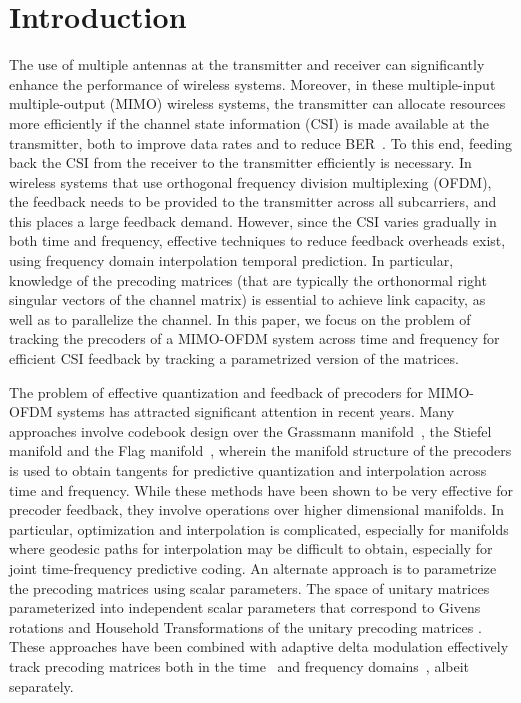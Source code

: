 \documentclass[journal,10pt,twocolumn]{IEEEtran}
\begin{document}
\section{Introduction}
\label{intro}

The use of multiple antennas at the transmitter and receiver can
significantly enhance the performance of wireless systems. Moreover,
in these multiple-input multiple-output (MIMO) wireless systems, the
transmitter can allocate resources more efficiently if the channel
state information (CSI) is made available at the transmitter, both to
improve data rates and to reduce BER~\cite{love2008overview}. To this
end, feeding back the CSI from the receiver to the transmitter
efficiently is necessary. In wireless systems that use orthogonal
frequency division multiplexing (OFDM), the feedback needs to be
provided to the transmitter across all subcarriers, and this places a
large feedback demand. However, since the CSI varies gradually in both
time and frequency, effective techniques to reduce feedback overheads
exist, using frequency domain interpolation temporal prediction. In
particular, knowledge of the precoding matrices (that are typically
the orthonormal right singular vectors of the channel matrix) is
essential to achieve link capacity, as well as to parallelize the
channel. In this paper, we focus on the problem of tracking the
precoders of a MIMO-OFDM system across time and frequency for
efficient CSI feedback by tracking a parametrized version of the matrices.

The problem of effective quantization and feedback of precoders for
MIMO-OFDM systems has attracted significant attention in recent
years. Many approaches involve codebook design over the Grassmann
manifold~\cite{mondal2007quantization,schwarz2013adaptive,5946308},
the Stiefel manifold \cite{6891198,Gupt1905:Predictive} and the Flag
manifold~\cite{pitaval2013codebooks}, wherein the manifold structure
of the precoders is used to obtain tangents for predictive
quantization and interpolation across time and frequency. While these
methods have been shown to be very effective for precoder feedback,
they involve operations over higher dimensional manifolds. In
particular, optimization and interpolation is complicated, especially
for manifolds where geodesic paths for interpolation may be difficult
to obtain, especially for joint time-frequency predictive coding. An
alternate approach is to parametrize the precoding matrices using
scalar parameters. The space of unitary matrices parameterized into
independent scalar parameters that correspond to Givens rotations and
Household Transformations of the unitary precoding matrices
\cite{4114278,4556174}. These approaches have been combined with
adaptive delta modulation effectively track precoding matrices both in
the time~\cite{4114278} and frequency domains~\cite{4556174}, albeit
separately.
\end{document}
